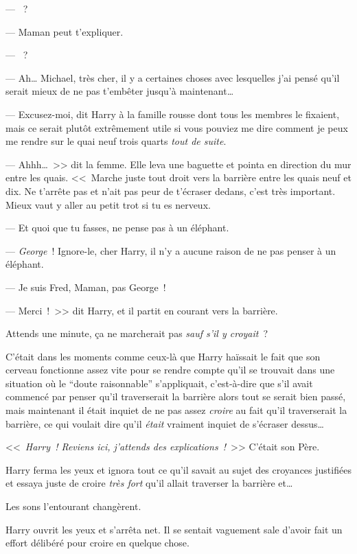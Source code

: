 --- ~?

--- Maman peut t'expliquer.

--- ~?

--- Ah… Michael, très cher, il y a certaines choses avec lesquelles j'ai pensé qu'il serait mieux de ne pas t'embêter jusqu'à maintenant…

--- Excusez-moi, dit Harry à la famille rousse dont tous les membres le fixaient, mais ce serait plutôt extrêmement utile si vous pouviez me dire comment je peux me rendre sur le quai neuf trois quarts \emph{tout de suite}.

--- Ahhh…~>> dit la femme. Elle leva une baguette et pointa en direction du mur entre les quais. <<~Marche juste tout droit vers la barrière entre les quais neuf et dix. Ne t'arrête pas et n'ait pas peur de t'écraser dedans, c'est très important. Mieux vaut y aller au petit trot si tu es nerveux.

--- Et quoi que tu fasses, ne pense pas à un éléphant.

--- \emph{George}~! Ignore-le, cher Harry, il n'y a aucune raison de ne pas penser à un éléphant.

--- Je suis Fred, Maman, pas George~!

--- Merci~!~>> dit Harry, et il partit en courant vers la barrière.

Attends une minute, ça ne marcherait pas \emph{sauf s'il y croyait}~?

C'était dans les moments comme ceux-là que Harry haïssait le fait que son cerveau fonctionne assez vite pour se rendre compte qu'il se trouvait dans une situation où le “doute raisonnable” s'appliquait, c'est-à-dire que s'il avait commencé par penser qu'il traverserait la barrière alors tout se serait bien passé, mais maintenant il était inquiet de ne pas assez \emph{croire} au fait qu'il traverserait la barrière, ce qui voulait dire qu'il \emph{était} vraiment inquiet de s'écraser dessus…

<<~\emph{Harry~! Reviens ici, j'attends des explications~!}~>> C'était son Père.

Harry ferma les yeux et ignora tout ce qu'il savait au sujet des croyances justifiées et essaya juste de croire \emph{très fort} qu'il allait traverser la barrière et…

Les sons l'entourant changèrent.

Harry ouvrit les yeux et s'arrêta net. Il se sentait vaguement sale d'avoir fait un effort délibéré pour croire en quelque chose.


